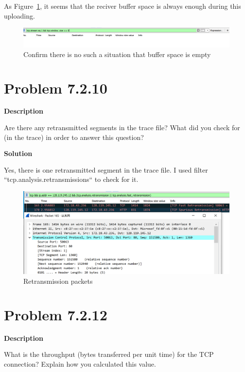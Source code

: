 \documentclass[12pt,letterpaper]{ctexart}
\begin{document}
As Figure~\ref{fig:window_size}, it seems that the reciver buffer space is always enough during this uploading.

\begin{figure}[H]
  \centering
  \includegraphics[width=\linewidth]{assets/window_size.png}
  \caption{Confirm there is no such a situation that buffer space is empty}
  \label{fig:window_size}
\end{figure}

\newpage

\section*{Problem 7.2.10}
{\bf Description}

Are there any retransmitted segments in the trace file? What did you check for (in the trace) in order to answer this question?

{\bf Solution}

Yes, there is one retransmitted segment in the trace file. I used filter ``tcp.analysis.retransmissions`` to check for it.

\begin{figure}[H]
  \centering
  \includegraphics[width=\linewidth]{assets/retransmition.png}
  \caption{Retransmission packets}
  \label{fig:retransmition}
\end{figure}


\newpage

\section*{Problem 7.2.12}
{\bf Description}

What is the throughput (bytes transferred per unit time) for the TCP connection?  Explain how you calculated this value.
\end{document}
